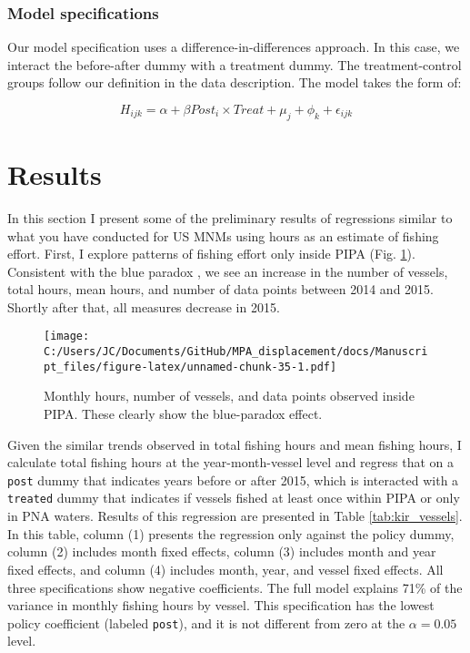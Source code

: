 \documentclass[]{article}
\theoremstyle{definition}
\theoremstyle{definition}
\theoremstyle{definition}
\theoremstyle{remark}
\begin{document}
\subsubsection{Model specifications}\label{model-specifications}

Our model specification uses a difference-in-differences approach. In
this case, we interact the before-after dummy with a treatment dummy.
The treatment-control groups follow our definition in the data
description. The model takes the form of:

\[
H_{ijk} = \alpha + \beta Post_i \times Treat + \mu_j + \phi_k + \epsilon_{ijk}
\]

\section{Results}\label{results}

In this section I present some of the preliminary results of regressions
similar to what you have conducted for US MNMs using hours as an
estimate of fishing effort. First, I explore patterns of fishing effort
only inside PIPA (Fig. \ref{fig:blue_para}). Consistent with the blue
paradox \citep{mcdermott_2018}, we see an increase in the number of
vessels, total hours, mean hours, and number of data points between 2014
and 2015. Shortly after that, all measures decrease in 2015.

\begin{figure}
\centering
\texttt{[image: C:/Users/JC/Documents/GitHub/MPA\_displacement/docs/Manuscript\_files/figure-latex/unnamed-chunk-35-1.pdf]}
\caption{\label{fig:unnamed-chunk-35}\label{fig:blue_para}Monthly hours,
number of vessels, and data points observed inside PIPA. These clearly
show the blue-paradox effect.}
\end{figure}

\clearpage

Given the similar trends observed in total fishing hours and mean
fishing hours, I calculate total fishing hours at the year-month-vessel
level and regress that on a \texttt{post} dummy that indicates years
before or after 2015, which is interacted with a \texttt{treated} dummy
that indicates if vessels fished at least once within PIPA or only in
PNA waters. Results of this regression are presented in Table
\ref{tab:kir_vessels}. In this table, column (1) presents the regression
only against the policy dummy, column (2) includes month fixed effects,
column (3) includes month and year fixed effects, and column (4)
includes month, year, and vessel fixed effects. All three specifications
show negative coefficients. The full model explains 71\% of the variance
in monthly fishing hours by vessel. This specification has the lowest
policy coefficient (labeled \texttt{post}), and it is not different from
zero at the \(\alpha = 0.05\) level.
\end{document}
